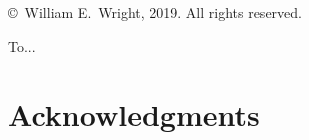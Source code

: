% 
% 
% 
% 
%






\captionsetup[subfigure]{labelfont=rm}



   \frontmatter

   \pagestyle{prelim}
   
   
   \newpage
	
	 \thispagestyle{empty}
	 \begin{titlepage}
	 \vspace*{50em}
	 \begin{center}
		 \copyright \ William E.\ Wright, 2019.  All rights reserved.  
	 \end{center}
	 \end{titlepage}
	 \newpage
	
	 \thispagestyle{empty}
	 \vspace*{20em}
	 \begin{center}
	   To...
	 \end{center}
	 \newpage
   
   \doublespacing
   
   \tableofcontents
   \newpage
   
   
   \newpage
   
   \section*{Acknowledgments}
   
   
   \mainmatter
   
   \pagestyle{maintext}
   
   
